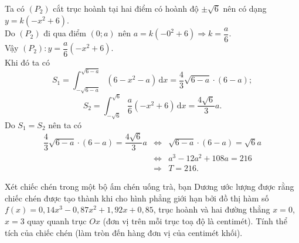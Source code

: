\begin{bt}
{		Ta có $\left(P_2\right)$ cắt  trục hoành tại hai điểm có hoành độ $\pm \sqrt{6}$ nên có dạng $y = k\left(-x^2 + 6\right)$.\\
		Do $\left(P_2\right)$ đi qua điểm $(0; a)$ nên $a = k\left(-0^2 + 6\right)  \Rightarrow k = \dfrac{a}{6}$.\\
		Vậy $\left(P_2\right) \colon y = \dfrac{a}{6} \left(-x^2  + 6\right)$.\\
		Khi đó ta có $$S_1 = \displaystyle\int_{-\sqrt{6-a}}^{\sqrt{6-a}} \left(6-x^2-a\right) \mathrm{\,d}x = \dfrac{4}{3} \sqrt{6-a} \cdot(6-a);$$ $$S_2 = \displaystyle\int_{-\sqrt{6}}^{\sqrt{6}} \dfrac{a}{6}  \left(-x^2 + 6\right) \mathrm{\,d}x = \dfrac{4\sqrt{6}}{3}a.$$
		 Do $S_1 = S_2$ nên ta có
		 {\allowdisplaybreaks
		\begin{eqnarray*}
			\dfrac{4}{3} \sqrt{6 - a} \cdot (6 - a) =  \dfrac{4\sqrt{6}}{3}a
			&\Leftrightarrow& \sqrt{6 - a} \cdot (6 - a) =  \sqrt{6}a\\
			&\Leftrightarrow& a^3 - 12a^2 + 108a= 216\\ 
			&\Rightarrow&  T = 216.
		\end{eqnarray*}
		} 
	} 
\end{bt}

\begin{bt}%
	Xét chiếc chén trong một bộ ấm chén uống trà, bạn Dương ước lượng được  rằng chiếc chén được tạo thành khi cho hình phẳng giới hạn bởi đồ thị hàm số $f(x)=0{,}14x^3-0{,}87x^2+1{,}92x+0{,}85$, trục hoành và hai đường thẳng $x=0$, $x=3$ quay quanh trục $Ox$ (đơn vị trên mỗi trục toạ độ là centimét). Tính thể tích của chiếc chén (làm tròn đến hàng đơn vị của centimét khối).
	\begin{center}
	\end{center}
\end{bt}

